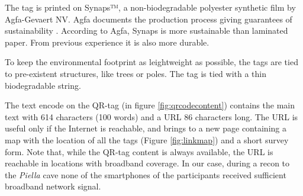 \documentclass[sustainability,article,submit,pdftex,moreauthors]{Definitions/mdpi}
\begin{document}
The tag is printed on Synaps™, a non-biodegradable polyester synthetic film by Agfa-Gevaert NV. Agfa documents the production process giving guarantees of sustainability \cite{agfa}. According to Agfa, Synaps is more sustainable than laminated paper. From previous experience it is also more durable.

To keep the environmental footprint as leightweight as possible, the tags are tied to pre-existent structures, like trees or poles. The tag is tied with a thin biodegradable string. 

The text encode on the QR-tag (in figure \ref{fig:qrcodecontent}) contains the main text with 614 characters (100 words) and a URL 86 characters long. The URL is useful only if the Internet is reachable, and brings to a new page containing a map with the location of all the tags (Figure \ref{fig:linkmap}) and a short survey form. Note that, while the QR-tag content is always available, the URL is reachable in locations with broadband coverage. In our case, during a recon to the {\em Piella} cave none of the smartphones of the participants received sufficient broadband network signal.

\begin{figure}
\end{figure}
\end{document}
